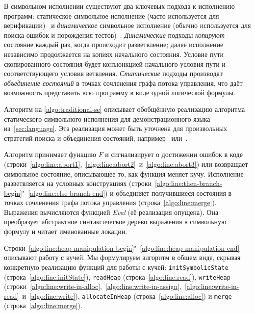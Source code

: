 В символьном исполнении существуют два ключевых подхода к исполнению программ: статическое символьное исполнение (часто используется для верификации)~\cite{koelbl2005constructing,babic2008calysto,dillig2008sound,xie2005scalable} и \emph{динамическое} символьное исполнение (обычно используется для поиска ошибок и порождения тестов)~\cite{tillmann2008pex,godefroid2005dart,bounimova2013billions}. \emph{Динамические} подходы \emph{копируют} состояние каждый раз, когда происходит разветвление; далее исполнение независимо продолжается на копиях начального состояния. Условие пути скопированного состояния будет конъюнкцией начального условия пути и соответствующего условия ветвления. \emph{Статические} подходы производят \emph{объединение состояний} в точках сочленения графа потока управления, что даёт возможность представить всю программу в виде одной логической формулы.

\traditionalalgo

Алгоритм на \autoref{algo:traditional-se} описывает обобщённую реализацию алгоритма статического символьного исполнения для демонстрационного языка из~\autoref{sec:language}. Эта реализация может быть уточнена для произвольных стратегий поиска и объединения состояний, например~\cite{kuznetsov2012efficient} или~\cite{avgerinos2014enhancing}.

Алгоритм принимает функцию $F$ и сигнализирует о достижении ошибок в коде (строки~\ref{algo:line:abort1},~\ref{algo:line:abort2}~и~\ref{algo:line:abort3}) или возвращает символьное состояние, описывающее то, как функция меняет кучу. Исполнение разветвляется на условных конструкциях (строки~\ref{algo:line:then-branch-begin}"~\ref{algo:line:else-branch-end}) и объединяет получившиеся состояния в точках сочленения графа потока управления (строка~\ref{algo:line:merge}). Выражения вычисляются функцией \emph{Eval} (её реализация опущена). Она преобразует абстрактное синтаксическое дерево выражения в символьную формулу и читает именованные локации.

Строки~\ref{algo:line:heap-manipulation-begin}"~\ref{algo:line:heap-manipulation-end} описывают работу с кучей. Мы формулируем алгоритм в общем виде, скрывая конкретную реализацию функций для работы с кучей: \texttt{initSymbolicState} (строка~\ref{algo:line:initState}), \texttt{readHeap} (строка~\ref{algo:line:read}), \texttt{writeHeap} (строки~\ref{algo:line:write-in-alloc},~\ref{algo:line:write-in-assign},~\ref{algo:line:write-in-read}~и~\ref{algo:line:write}), \texttt{allocateInHeap} (строка~\ref{algo:line:alloc}) и \texttt{merge} (строка~\ref{algo:line:merge}).

